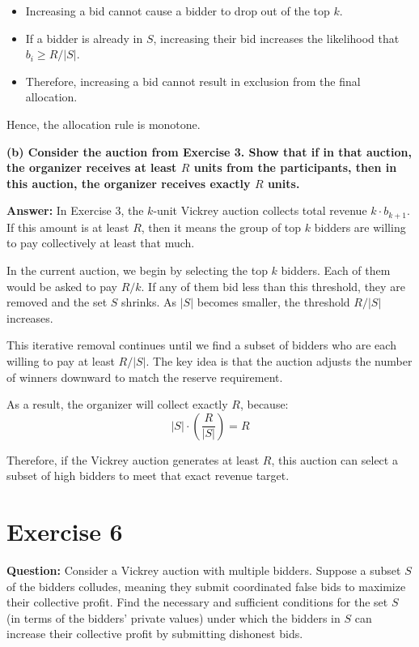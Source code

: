 \documentclass[12pt]{article}
\begin{document}
\begin{itemize}
  \item Increasing a bid cannot cause a bidder to drop out of the top $k$.
  \item If a bidder is already in $S$, increasing their bid increases the likelihood that $b_i \geq R/|S|$.
  \item Therefore, increasing a bid cannot result in exclusion from the final allocation.
\end{itemize}

Hence, the allocation rule is monotone.

\textbf{(b) Consider the auction from Exercise 3. Show that if in that auction, the organizer receives at least $R$ units from the participants, then in this auction, the organizer receives exactly $R$ units.}

\textbf{Answer:} In Exercise 3, the $k$-unit Vickrey auction collects total revenue $k \cdot b_{k+1}$. If this amount is at least $R$, then it means the group of top $k$ bidders are willing to pay collectively at least that much.

In the current auction, we begin by selecting the top $k$ bidders. Each of them would be asked to pay $R/k$. If any of them bid less than this threshold, they are removed and the set $S$ shrinks. As $|S|$ becomes smaller, the threshold $R/|S|$ increases.

This iterative removal continues until we find a subset of bidders who are each willing to pay at least $R/|S|$. The key idea is that the auction adjusts the number of winners downward to match the reserve requirement.

As a result, the organizer will collect exactly $R$, because:
\[ 
|S| \cdot \left(\frac{R}{|S|}\right) = R 
\]

Therefore, if the Vickrey auction generates at least $R$, this auction can select a subset of high bidders to meet that exact revenue target.

\section*{Exercise 6}

\textbf{Question:} Consider a Vickrey auction with multiple bidders. Suppose a subset $S$ of the bidders colludes, meaning they submit coordinated false bids to maximize their collective profit. Find the necessary and sufficient conditions for the set $S$ (in terms of the bidders' private values) under which the bidders in $S$ can increase their collective profit by submitting dishonest bids.
\end{document}
